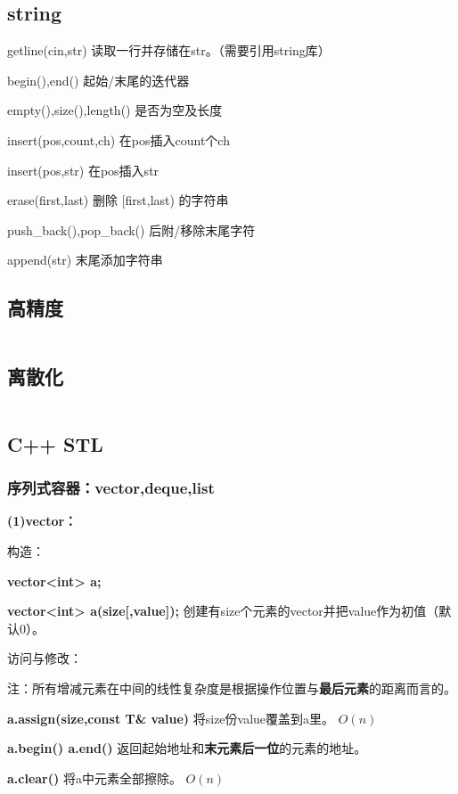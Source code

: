 \documentclass[a4paper,11pt]{article}
\begin{document}
\subsection{string}
getline(cin,str) 读取一行并存储在str。（需要引用string库）

begin(),end() 起始/末尾的迭代器

empty(),size(),length() 是否为空及长度

insert(pos,count,ch) 在pos插入count个ch

insert(pos,str) 在pos插入str

erase(first,last) 删除 [first,last) 的字符串

push\_back(),pop\_back() 后附/移除末尾字符

append(str) 末尾添加字符串

\subsection{高精度}
\inputminted[linenos]{c++}{basic/high.cpp}
\subsection{离散化}
\inputminted[linenos]{c++}{basic/discretization.cpp}

\subsection{C++ STL}
\subsubsection{序列式容器：vector,deque,list}
\textbf{(1)vector：}

构造：

\textbf{vector\textless{}int\textgreater{} a; }

\textbf{vector\textless{}int\textgreater{} a(size{[},value{]});}
创建有size个元素的vector并把value作为初值（默认0）。

访问与修改：

注：所有增减元素在中间的线性复杂度是根据操作位置与\textbf{最后元素}的距离而言的。

\textbf{a.assign(size,const T\& value)} 将size份value覆盖到a里。
\(O(n)\)

\textbf{a.begin() a.end()}
返回起始地址和\textbf{末元素后一位}的元素的地址。

\textbf{a.clear()} 将a中元素全部擦除。 \(O(n)\)
\end{document}

